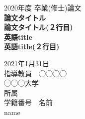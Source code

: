 \documentclass[a4paper, 10pt]{ltjsarticle}
\begin{document}
\thispagestyle{empty}
\begin{center}

\vspace{20mm}
{\Large\noindent 2020年度 卒業(修士)論文}\\
\vspace{40mm}
{\huge\noindent\textbf{論文タイトル}}\\
\medskip
{\huge\noindent\textbf{論文タイトル(２行目)}}\\
\vspace{\baselineskip}
{\huge\noindent\textbf{英語title}}\\
\medskip
{\huge\noindent\textbf{英語title(２行目)}}\\
\vspace{40mm}

{\Large\noindent
2021年1月31日\\
\vspace{\baselineskip}
指導教員　◯◯◯◯    \\
\vspace{\baselineskip}
◯◯◯大学\\
所属 \\
\vspace{\baselineskip}
学籍番号　名前\\
name \\
}
\vspace{40mm}

\end{center}

\thispagestyle{empty}
\clearpage
\end{document}
